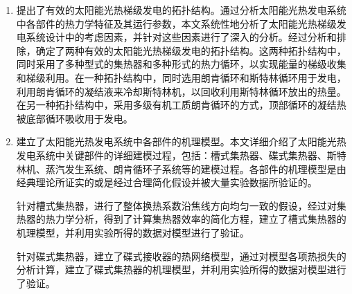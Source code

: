 \begin{enumerate}[label=(\arabic*)]
  \item 提出了有效的太阳能光热梯级发电的拓扑结构。通过分析太阳能光热发电系统中各部件的热力学特征及其运行参数，本文系统性地分析了太阳能光热梯级发电系统设计中的考虑因素，并针对这些因素进行了深入的分析。经过分析和排除，确定了两种有效的太阳能光热梯级发电的拓扑结构。这两种拓扑结构中，同时采用了多种型式的集热器和多种形式的热力循环，以实现能量的梯级收集和梯级利用。在一种拓扑结构中，同时选用朗肯循环和斯特林循环用于发电，利用朗肯循环的凝结液来冷却斯特林机，以回收利用斯特林循环放出的热量。在另一种拓扑结构中，采用多级有机工质朗肯循环的方式，顶部循环的凝结热被底部循环吸收用于发电。
  \item 建立了太阳能光热发电系统中各部件的机理模型。本文详细介绍了太阳能光热发电系统中关键部件的详细建模过程，包括：槽式集热器、碟式集热器、斯特林机、蒸汽发生系统、朗肯循环子系统等的建模过程。各部件的机理模型是由经典理论所证实的或是经过合理简化假设并被大量实验数据所验证的。
  
  针对槽式集热器，进行了整体换热系数沿焦线方向均匀一致的假设，经过对集热器的热力学分析，得到了计算集热器效率的简化方程，建立了槽式集热器的机理模型，并利用实验所得的数据对模型进行了验证。
  
  针对碟式集热器，建立了碟式接收器的热网络模型，通过对模型各项热损失的分析计算，建立了碟式集热器的机理模型，并利用实验所得的数据对模型进行了验证。
  

\end{enumerate}
